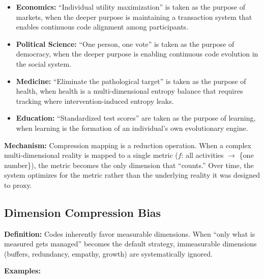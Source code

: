 \documentclass[11pt,a4paper]{article}
\begin{document}
\begin{itemize}
    \item \textbf{Economics:} ``Individual utility maximization'' is taken as the purpose of markets, when the deeper purpose is maintaining a transaction system that enables continuous code alignment among participants.

    \item \textbf{Political Science:} ``One person, one vote'' is taken as the purpose of democracy, when the deeper purpose is enabling continuous code evolution in the social system.

    \item \textbf{Medicine:} ``Eliminate the pathological target'' is taken as the purpose of health, when health is a multi-dimensional entropy balance that requires tracking where intervention-induced entropy leaks.

    \item \textbf{Education:} ``Standardized test scores'' are taken as the purpose of learning, when learning is the formation of an individual's own evolutionary engine.
\end{itemize}

\textbf{Mechanism:} Compression mapping is a reduction operation. When a complex multi-dimensional reality is mapped to a single metric ($f$: all activities $\rightarrow$ \{one number\}), the metric becomes the only dimension that ``counts.'' Over time, the system optimizes for the metric rather than the underlying reality it was designed to proxy.

\subsection{Dimension Compression Bias}

\textbf{Definition:} Codes inherently favor measurable dimensions. When ``only what is measured gets managed'' becomes the default strategy, immeasurable dimensions (buffers, redundancy, empathy, growth) are systematically ignored.

\textbf{Examples:}
\end{document}
